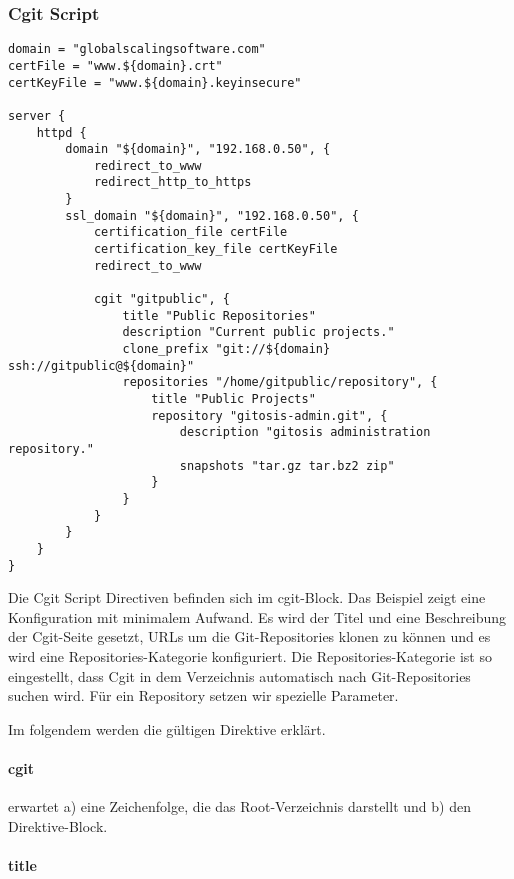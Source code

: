 \subsubsection{Cgit Script}

\begin{lstlisting}[style=Java, caption=Beispiel Cgit Script]
domain = "globalscalingsoftware.com"
certFile = "www.${domain}.crt"
certKeyFile = "www.${domain}.keyinsecure"

server {
    httpd {
        domain "${domain}", "192.168.0.50", {
            redirect_to_www
            redirect_http_to_https
        }
        ssl_domain "${domain}", "192.168.0.50", {
            certification_file certFile
            certification_key_file certKeyFile
            redirect_to_www

            cgit "gitpublic", {
                title "Public Repositories"
                description "Current public projects."
                clone_prefix "git://${domain} ssh://gitpublic@${domain}"
                repositories "/home/gitpublic/repository", {
                    title "Public Projects"
                    repository "gitosis-admin.git", {
                        description "gitosis administration repository."
                        snapshots "tar.gz tar.bz2 zip"
                    }
                }
            }
        }
    }
}
\end{lstlisting}

Die Cgit Script Directiven befinden sich im cgit-Block. Das Beispiel zeigt eine Konfiguration mit minimalem Aufwand. Es wird der Titel und eine Beschreibung der Cgit-Seite gesetzt, URLs um die Git-Repositories klonen zu können und es wird eine Repositories-Kategorie konfiguriert. Die Repositories-Kategorie ist so eingestellt, dass Cgit in dem Verzeichnis automatisch nach Git-Repositories suchen wird. Für ein Repository setzen wir spezielle Parameter.

Im folgendem werden die gültigen Direktive erklärt.

\paragraph{cgit}

 erwartet a) eine Zeichenfolge, die das Root-Verzeichnis darstellt und b) den Direktive-Block.

\paragraph{title}

